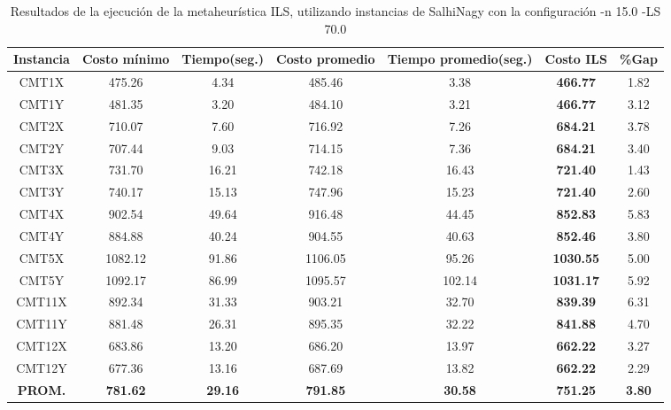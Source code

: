 \begin{table}[ht]
\caption{Resultados de la ejecución de la metaheurística ILS, utilizando instancias de SalhiNagy con la configuración -n 15.0 -LS 70.0}
\centering
\small
\begin{tabular}{c c c c c c c}
\hline\hline
Instancia & Costo mínimo & Tiempo(seg.) & Costo promedio & Tiempo promedio(seg.) & Costo ILS & \%Gap \\ [0.5ex]
\hline
CMT1X & 475.26 & 4.34 & 
485.46 & 3.38 & \bf{466.77} & 
1.82\\CMT1Y & 481.35 & 3.20 & 
484.10 & 3.21 & \bf{466.77} & 
3.12\\CMT2X & 710.07 & 7.60 & 
716.92 & 7.26 & \bf{684.21} & 
3.78\\CMT2Y & 707.44 & 9.03 & 
714.15 & 7.36 & \bf{684.21} & 
3.40\\CMT3X & 731.70 & 16.21 & 
742.18 & 16.43 & \bf{721.40} & 
1.43\\CMT3Y & 740.17 & 15.13 & 
747.96 & 15.23 & \bf{721.40} & 
2.60\\CMT4X & 902.54 & 49.64 & 
916.48 & 44.45 & \bf{852.83} & 
5.83\\CMT4Y & 884.88 & 40.24 & 
904.55 & 40.63 & \bf{852.46} & 
3.80\\CMT5X & 1082.12 & 91.86 & 
1106.05 & 95.26 & \bf{1030.55} & 
5.00\\CMT5Y & 1092.17 & 86.99 & 
1095.57 & 102.14 & \bf{1031.17} & 
5.92\\CMT11X & 892.34 & 31.33 & 
903.21 & 32.70 & \bf{839.39} & 
6.31\\CMT11Y & 881.48 & 26.31 & 
895.35 & 32.22 & \bf{841.88} & 
4.70\\CMT12X & 683.86 & 13.20 & 
686.20 & 13.97 & \bf{662.22} & 
3.27\\CMT12Y & 677.36 & 13.16 & 
687.69 & 13.82 & \bf{662.22} & 
2.29\\\bf{PROM.} & 
\bf{781.62} & \bf{29.16} & \bf{791.85} & \bf{30.58} & \bf{751.25} & \bf{3.80}\\[1ex]\hline
\end{tabular}
\label{table:nonlin}
\end{table} \clearpage
